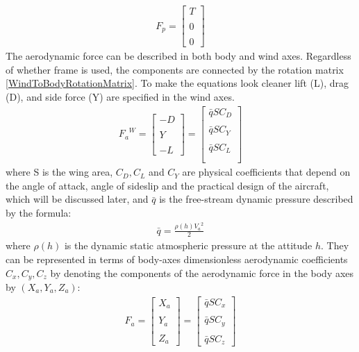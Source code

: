 \documentclass[conference]{IEEEtran}
\begin{document}
\begin{align}
    F_p=\begin{bmatrix}
            T \\\\
            0 \\\\
            0
        \end{bmatrix}
    \label{ThrustInPropulsionVector}
\end{align}
The aerodynamic force can be described in both body and wind axes. Regardless of whether frame is used, the components are connected by the rotation matrix {\ref{WindToBodyRotationMatrix}}.
To make the equations look cleaner lift (L), drag (D), and side force (Y) are specified in the wind axes.
\begin{align}
    {F_a}^W=\begin{bmatrix}
                -D \\\\
                Y  \\\\
                -L
            \end{bmatrix}=
    \begin{bmatrix}
        \bar{q}S{C_D} \\\\
        \bar{q}S{C_Y} \\\\
        \bar{q}S{C_L} \\\\
    \end{bmatrix}
    \label{AerodynamicForceInTermsOfDynamicPressureInTheWindFrame}
\end{align} where S is the wing area, $C_D,C_L$ and $C_Y$ are physical coefficients that depend on the angle of attack, angle of sideslip and the practical design of the aircraft, which will be discussed later, and $\bar{q}$ is the free-stream dynamic pressure described by the formula:
\begin{align}
    \bar{q}=\frac{\rho(h){V_a}^2}{2}
\end{align}
where $\rho(h)$ is the dynamic static atmospheric pressure at the attitude $h$. They can be represented in terms of body-axes dimensionless aerodynamic coefficients $C_x,C_y,C_z$ by denoting the components of the aerodynamic force in the body axes by $(X_a,Y_a,Z_a)$:
\begin{align}
    F_a=\begin{bmatrix}
            X_a \\\\
            Y_a \\\\
            Z_a
        \end{bmatrix}=
    \begin{bmatrix}
        \bar{q}S{C_x} \\\\
        \bar{q}S{C_y} \\\\
        \bar{q}S{C_z}
    \end{bmatrix}
    \label{AerodynamicForceInTermsOfDynamicPressureInTheBodyFrame}
\end{align}
\end{document}

